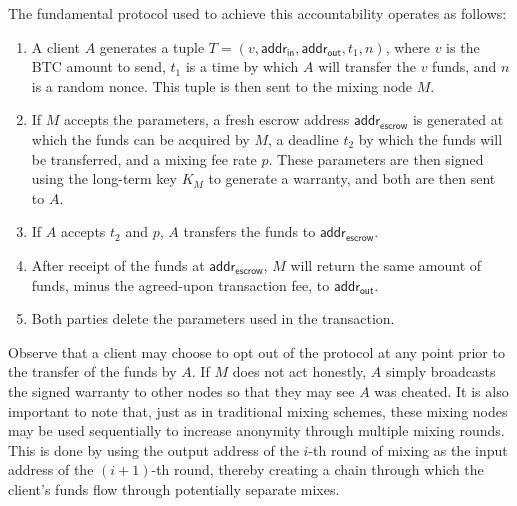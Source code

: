 The fundamental protocol used to achieve this accountability operates as follows:
\begin{enumerate}
	\item A client $A$ generates a tuple $T = (v, \mathsf{addr}_{\mathsf{in}}, \mathsf{addr}_{\mathsf{out}}, t_1, n)$, where $v$ is the BTC amount to send, $t_1$ is a time by which $A$ will transfer the $v$ funds, and $n$ is a random nonce. This tuple is then sent to the mixing node $M$.
	\item If $M$ accepts the parameters, a fresh escrow address $\mathsf{addr}_{\mathsf{escrow}}$ is generated at which the funds can be acquired by $M$, a deadline $t_2$ by which the funds will be transferred, and a mixing fee rate $p$. These parameters are then signed using the long-term key $K_M$ to generate a warranty, and both are then sent to $A$.
	\item If $A$ accepts $t_2$ and $p$, $A$ transfers the funds to $\mathsf{addr}_{\mathsf{escrow}}$.
	\item After receipt of the funds at $\mathsf{addr}_{\mathsf{escrow}}$, $M$ will return the same amount of funds, minus the agreed-upon transaction fee, to $\mathsf{addr}_{\mathsf{out}}$.
	\item Both parties delete the parameters used in the transaction.
\end{enumerate}

Observe that a client may choose to opt out of the protocol at any point prior to the transfer of the funds by $A$. If $M$ does not act honestly, $A$ simply broadcasts the signed warranty to other nodes so that they may see $A$ was cheated. It is also important to note that, just as in traditional mixing schemes, these mixing nodes may be used sequentially to increase anonymity through multiple mixing rounds. This is done by using the output address of the $i$-th round of mixing as the input address of the $(i+1)$-th round, thereby creating a chain through which the client's funds flow through potentially separate mixes. 


